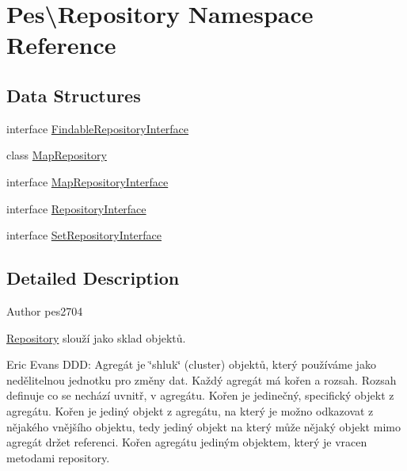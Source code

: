 \hypertarget{namespace_pes_1_1_repository}{}\section{Pes\textbackslash{}Repository Namespace Reference}
\label{namespace_pes_1_1_repository}
\subsection*{Data Structures}
\begin{DoxyCompactItemize}
\item 
interface \mbox{\hyperlink{interface_pes_1_1_repository_1_1_findable_repository_interface}{Findable\+Repository\+Interface}}
\item 
class \mbox{\hyperlink{class_pes_1_1_repository_1_1_map_repository}{Map\+Repository}}
\item 
interface \mbox{\hyperlink{interface_pes_1_1_repository_1_1_map_repository_interface}{Map\+Repository\+Interface}}
\item 
interface \mbox{\hyperlink{interface_pes_1_1_repository_1_1_repository_interface}{Repository\+Interface}}
\item 
interface \mbox{\hyperlink{interface_pes_1_1_repository_1_1_set_repository_interface}{Set\+Repository\+Interface}}
\end{DoxyCompactItemize}


\subsection{Detailed Description}
\begin{DoxyAuthor}{Author}
pes2704
\end{DoxyAuthor}
\mbox{\hyperlink{namespace_pes_1_1_repository}{Repository}} slouží jako sklad objektů.

Eric Evans D\+DD\+: Agregát je \char`\"{}shluk\char`\"{} (cluster) objektů, který používáme jako nedělitelnou jednotku pro změny dat. Každý agregát má kořen a rozsah. Rozsah definuje co se nechází uvnitř, v agregátu. Kořen je jedinečný, specifický objekt z agregátu. Kořen je jediný objekt z agregátu, na který je možno odkazovat z nějakého vnějšího objektu, tedy jediný objekt na který může nějaký objekt mimo agregát držet referenci. Kořen agregátu jediným objektem, který je vracen metodami repository.

